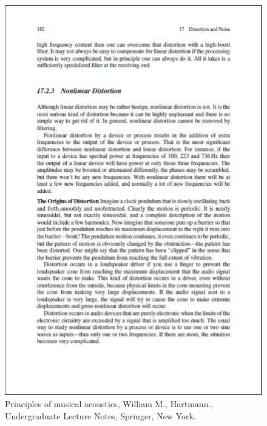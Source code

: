 \begin{figure}[!htb]
	\centering
	\includegraphics[scale=0.8]{distorsion1.jpg}
	\caption{Principles of musical acoustics, William M., Hartmann., Undergraduate Lecture Notes, Springer, New York.}
\end{figure}

